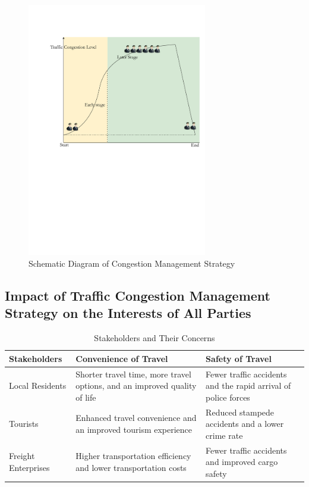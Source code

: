 \documentclass{mcmthesis}
\begin{document}
\begin{figure}[H]
  \centering
  \includegraphics[width=0.7\textwidth]{figures/3stage.pdf}
  \caption{Schematic Diagram of Congestion Management Strategy}
  \label{fig:3stage}
\end{figure}

\subsection{Impact of Traffic Congestion Management Strategy on the Interests of All Parties}

\begin{table}[H]
  \centering
  \caption{Stakeholders and Their Concerns}
  \label{tab:stakeholder_concerns}
  \begin{tabularx}{\textwidth}{@{}lXX@{}} 
      \toprule
      \textbf{Stakeholders} & \textbf{Convenience of Travel} & \textbf{Safety of Travel} \\
      \midrule
      Local Residents & Shorter travel time, more travel options, and an improved quality of life & Fewer traffic accidents and the rapid arrival of police forces \\
      Tourists & Enhanced travel convenience and an improved tourism experience & Reduced stampede accidents and a lower crime rate \\
      Freight Enterprises & Higher transportation efficiency and lower transportation costs & Fewer traffic accidents and improved cargo safety \\
      \bottomrule
  \end{tabularx}
\end{table}
\end{document}
